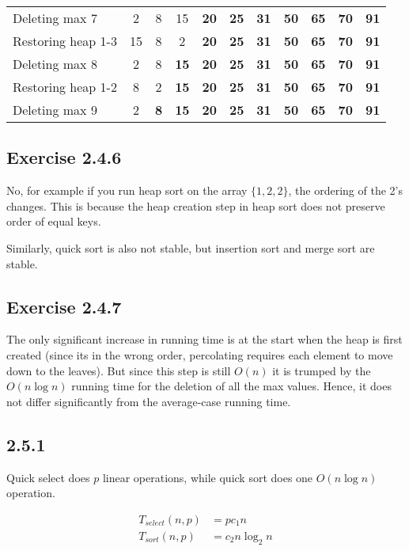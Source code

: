 \documentclass{article}
\begin{document}
\begin{tabular}{|l|c|c|c|c|c|c|c|c|c|c|}
\hline
Deleting max 7& 2& 8& 15& \textbf{20}& \textbf{25}& \textbf{31}& \textbf{50}& \textbf{65}& \textbf{70}& \textbf{91} \\
Restoring heap 1-3& 15& 8& 2& \textbf{20}& \textbf{25}& \textbf{31}& \textbf{50}& \textbf{65}& \textbf{70}& \textbf{91} \\
\hline
Deleting max 8& 2& 8& \textbf{15}& \textbf{20}& \textbf{25}& \textbf{31}& \textbf{50}& \textbf{65}& \textbf{70}& \textbf{91} \\
Restoring heap 1-2& 8& 2& \textbf{15}& \textbf{20}& \textbf{25}& \textbf{31}& \textbf{50}& \textbf{65}& \textbf{70}& \textbf{91} \\
\hline
Deleting max 9& 2& \textbf{8}& \textbf{15}& \textbf{20}& \textbf{25}& \textbf{31}& \textbf{50}& \textbf{65}& \textbf{70}& \textbf{91} \\
\hline
\end{tabular}


\subsection*{Exercise 2.4.6}

No, for example if you run heap sort on the array \(\{1,2,2\}\), the ordering of the 2's changes. This is because the heap creation step in heap sort does not preserve order of equal keys.

Similarly, quick sort is also not stable, but insertion sort and merge sort are stable.


\subsection*{Exercise 2.4.7}

The only significant increase in running time is at the start when the heap is first created (since its in the wrong order, percolating requires each element to move down to the leaves). But since this step is still \(O(n)\) it is trumped by the \(O(n\log{n})\) running time for the deletion of all the max values. Hence, it does not differ significantly from the average-case running time.


\subsection*{2.5.1}

Quick select does \(p\) linear operations, while quick sort does one \(O(n\log{n})\) operation.

\begin{align*}
T_{select}(n,p) &= pc_1n \\
T_{sort}(n,p) &= c_2n \log_2{n} \\
\end{align*}
\end{document}

